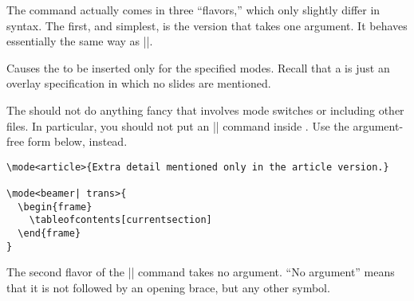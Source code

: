 The command actually comes in three ``flavors,'' which only slightly differ in syntax. The first, and simplest, is the version that takes one argument. It behaves essentially the same way as |\only|.

\begin{command}{\mode{}}
  Causes the  to be inserted only for the specified modes. Recall that a  is just an overlay specification in which no slides are mentioned.

  The  should not do anything fancy that involves mode switches or including other files. In particular, you should not put an || command inside . Use the argument-free form below, instead.

  \example
\begin{verbatim}
\mode<article>{Extra detail mentioned only in the article version.}

\mode<beamer| trans>{
  \begin{frame}
    \tableofcontents[currentsection]
  \end{frame}
}
\end{verbatim}
\end{command}

The second flavor of the |\mode| command takes no argument. ``No argument'' means that it is not followed by an opening brace, but any other symbol.

